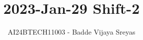 \documentclass[journal]{IEEEtran}
\begin{document}

\vspace{3cm}

\title{2023-Jan-29 Shift-2}
\author{AI24BTECH11003 - Badde Vijaya Sreyas}
{\let\newpage\relax\maketitle}

\renewcommand{\thefigure}{\theenumi}
\renewcommand{\thetable}{\theenumi}
\setlength{\intextsep}{10pt} %


\renewcommand{\thetable}{\theenumi}
\end{document}
